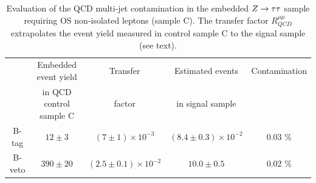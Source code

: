 \begin{table} [!htp]
\begin{footnotesize}
\centering
\begin{tabular}{c c c c c}
\hline
\hline
 & Embedded event yield	& Transfer	& Estimated events	& Contamination \\
 &  in QCD control sample C		& factor	& in signal sample	&	\\		 [0.5ex]
\hline
B-tag  & $12 \pm 3$ & $ (7 \pm 1) \times 10^{-3}$ &  $(8.4 \pm 0.3) \times 10^{-2}$ &  0.03 \% \\
B-veto & $390 \pm 20$ & $(2.5 \pm 0.1) \times 10^{-2}$ & $10.0 \pm 0.5$ & 0.02 \% \\[1ex]
\hline
\end{tabular}
\end{footnotesize}
\caption{Evaluation of the QCD multi-jet contamination  in the embedded $Z\rightarrow \tau\tau$ sample  requiring OS non-isolated leptons
	(sample C). The transfer factor $R_{QCD}^{\mu\mu}$ extrapolates the event yield measured in control sample C to the signal 
	sample (see text).}
\label{table:emb_cont_qcd}
\end{table}




